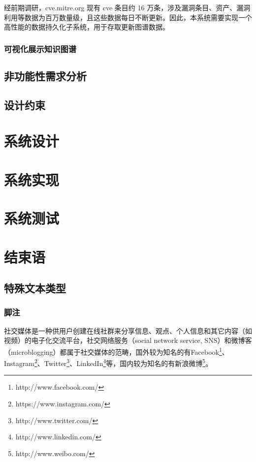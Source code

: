 \documentclass[a4paper,AutoFakeBold,oneside,12pt]{book}
\begin{document}
经前期调研，cve.mitre.org 现有 cve 条目约 16 万条，涉及漏洞条目、资产、漏洞利用等数据为百万数量级，且这些数据每日不断更新。因此，本系统需要实现一个高性能的数据持久化子系统，用于存取更新图谱数据。

\subsection{可视化展示知识图谱}




\section{非功能性需求分析}



\section{设计约束}





\chapter{系统设计}

\chapter{系统实现}

\chapter{系统测试}

\chapter{结束语}



\section{特殊文本类型}
\subsection{脚注}
社交媒体是一种供用户创建在线社群来分享信息、观点、个人信息和其它内容（如视频）的电子化交流平台，社交网络服务（social network service, SNS）和微博客（microblogging）都属于社交媒体的范畴\cite{webster_social_media}，国外较为知名的有Facebook\footnote{http://www.facebook.com/}、Instagram\footnote{https://www.instagram.com/}、Twitter\footnote{http://www.twitter.com/}、LinkedIn\footnote{http://www.linkedin.com/}等，国内较为知名的有新浪微博\footnote{http://www.weibo.com/}。
\end{document}
